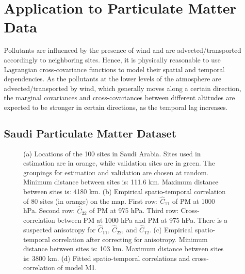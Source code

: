 \documentclass[12pt]{article}
\newcommand{\0}{\mathbf{0}}
\begin{document}
\section{Application to Particulate Matter Data}\label{sec:application}

Pollutants are influenced by the presence of wind and are advected/transported accordingly to neighboring sites. Hence, it is physically reasonable to use Lagrangian cross-covariance functions to model their spatial and temporal dependencies. As the pollutants at the lower levels of the atmosphere are advected/transported by wind, which generally moves along a certain direction, the marginal covariances and cross-covariances between different altitudes are expected to be stronger in certain directions, as the temporal lag increases. 

\subsection{Saudi Particulate Matter Dataset}\label{sec:application_data}

\begin{figure}[htb!]
 \centering
\quad \quad{}%
  \; %
     \quad \quad \quad \quad   
    \caption{\small (a) Locations of the 100 sites in Saudi Arabia. Sites used in estimation are in orange, while validation sites are in green. The groupings for estimation and validation are chosen at random. Minimum distance between sites is: 111.6 km. Maximum distance between sites is: 4180 km. (b) Empirical spatio-temporal correlation of 80 sites (in orange) on the map. First row: $\hat{C}_{11}$ of PM at 1000 hPa. Second row: $\hat{C}_{22}$ of PM at 975 hPa. Third row: Cross-correlation between PM at 1000 hPa and PM at 975 hPa. There is a suspected anisotropy for $\hat{C}_{11}$, $\hat{C}_{22}$, and $\hat{C}_{12}$. (c) Empirical spatio-temporal correlation after correcting for anisotropy. Minimum distance between sites is: 103 km. Maximum distance between sites is: 3800 km. (d) Fitted spatio-temporal correlations and cross-correlation of model M1.}
    \label{fig:saudi_map}
\end{figure}
\end{document}
